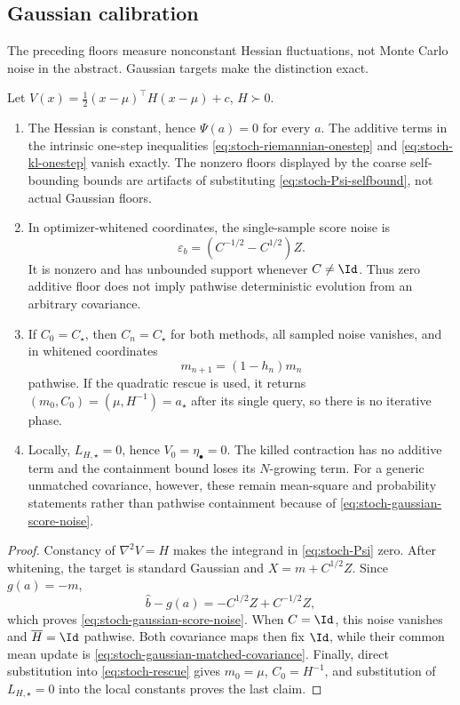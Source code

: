 \subsection{Gaussian calibration}
\label{sec:stoch-gaussian}

The preceding floors measure nonconstant Hessian fluctuations, not Monte
Carlo noise in the abstract.  Gaussian targets make the distinction exact.

\begin{proposition}
\label{prop:stoch-gaussian-calibration}
Let
\(V(x)=\tfrac12(x-\mu)^\top H(x-\mu)+c\), \(H\succ0\).
\begin{enumerate}[label=\textup{(\roman*)}]
\item The Hessian is constant, hence \(\Psi(a)=0\) for every \(a\).  The
additive terms in the intrinsic one-step inequalities
\eqref{eq:stoch-riemannian-onestep} and
\eqref{eq:stoch-kl-onestep} vanish exactly.  The nonzero floors displayed by
the coarse self-bounding bounds are artifacts of substituting
\eqref{eq:stoch-Psi-selfbound}, not actual Gaussian floors.
\item In optimizer-whitened coordinates, the single-sample score noise is
\begin{equation}
  \varepsilon_b=(C^{-1/2}-C^{1/2})Z.
  \label{eq:stoch-gaussian-score-noise}
\end{equation}
It is nonzero and has unbounded support whenever \(C\neq\Id\).  Thus zero
additive floor does not imply pathwise deterministic evolution from an
arbitrary covariance.
\item If \(C_0=C_\star\), then \(C_n=C_\star\) for both methods, all sampled
noise vanishes, and in whitened coordinates
\begin{equation}
  m_{n+1}=(1-h_n)m_n
  \label{eq:stoch-gaussian-matched-covariance}
\end{equation}
pathwise.  If the quadratic rescue is used, it returns
\((m_0,C_0)=(\mu,H^{-1})=a_\star\) after its single query, so there is no
iterative phase.
\item Locally, \(L_{H,\star}=0\), hence \(V_0=\eta_\bullet=0\).  The killed
contraction has no additive term and the containment bound loses its
\(N\)-growing term.  For a generic unmatched covariance, however, these
remain mean-square and probability statements rather than pathwise
containment because of \eqref{eq:stoch-gaussian-score-noise}.
\end{enumerate}
\end{proposition}

\begin{proof}
Constancy of \(\nabla^2V=H\) makes the integrand in
\eqref{eq:stoch-Psi} zero.  After whitening, the target is standard
Gaussian and \(X=m+C^{1/2}Z\).  Since \(g(a)=-m\),
\[
  \widehat b-g(a)
  =-C^{1/2}Z+C^{-1/2}Z,
\]
which proves \eqref{eq:stoch-gaussian-score-noise}.  When \(C=\Id\), this
noise vanishes and \(\overline H=\Id\) pathwise.  Both covariance maps then
fix \(\Id\), while their common mean update is
\eqref{eq:stoch-gaussian-matched-covariance}.  Finally, direct substitution
into \eqref{eq:stoch-rescue} gives \(m_0=\mu\), \(C_0=H^{-1}\), and
substitution of \(L_{H,\star}=0\) into the local constants proves the last
claim.
\end{proof}
